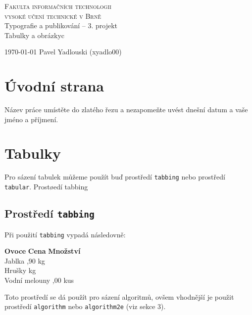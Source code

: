 \documentclass[11pt,a4paper]{article}
\begin{document}
\begin{titlepage}
    \begin{center}
        \textsc{\Huge Fakulta informačních technologii\\\vspace{0.4em}
        vysoké učení technické v Brně}\\
        {\LARGE Typografie a publikování -- 3. projekt\\\vspace{0.3em}
       Tabulky a obrázky}c
    \end{center}
    \begin{flushleft}
        \today
        \hfill
        Pavel Yadlouski (xyadlo00)
    \end{flushleft}
\end{titlepage}

\newpage

\section{Úvodní strana}
Název práce umístěte do zlatého řezu a nezapomeňte uvést dnešní datum a vaše jméno a příjmení.

\section{Tabulky}

Pro sázení tabulek můžeme použít buď prostředí \texttt{tabbing} nebo prostředí \texttt{tabular}.
Prostøedí tabbing

\subsection{Prostředí \texttt{tabbing}}

Při použití \texttt{tabbing} vypadá následovně:

\begin{tabbing}
    \textbf{Ovoce }\hspace{1.5cm} \=   \textbf{Cena } \hspace{0.1cm} \= \textbf{Množství}\\ 
    Jablka ,90  kg\\
    Hrušky   kg \\
    Vodní melouny ,00  kus
\end{tabbing}
Toto prostředí se dá použít pro sázení algoritmů, ovšem vhodnější je použit prostředí \texttt{algorithm} nebo \texttt{algorithm2e} (viz sekce 3).
\end{document}

